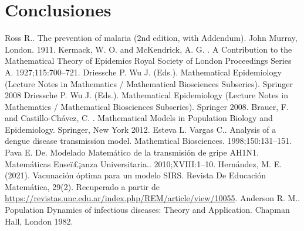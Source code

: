 \documentclass[journal]{IEEEtran}
\begin{document}
\section{Conclusiones}


\ifCLASSOPTIONcaptionsoff
  \newpage
\fi

\begin{thebibliography}{1}

	Ross R.. The prevention of malaria (2nd edition, with Addendum). John Murray, London. 1911.
  Kermack, W. O. and McKendrick, A. G. . A Contribution to the Mathematical Theory of Epidemics
Royal Society of London Proceedings Series A. 1927;115:700–721.
  Driessche P. Wu J. (Eds.). Mathematical Epidemiology (Lecture Notes in Mathematics / Mathematical
Biosciences Subseries). Springer 2008
  Driessche P. Wu J. (Eds.). Mathematical Epidemiology (Lecture Notes in Mathematics / Mathematical
Biosciences Subseries). Springer 2008.
  Brauer, F. and Castillo-Chávez, C. . Mathematical Models in Population Biology and Epidemiology.
Springer, New York 2012.
  Esteva L. Vargas C.. Analysis of a dengue disease transmission model. Mathemtical Biosciences.
1998;150:131–151.
  Pava E. De. Modelado Matemático de la transmisión de gripe AH1N1. Matemáticas Enseï£¡anza
Universitaria.. 2010;XVIII:1–10.
  Hernández, M. E. (2021). Vacunación óptima para un modelo SIRS. Revista De Educación Matemática, 29(2).
Recuperado a partir de \url{https://revistas.unc.edu.ar/index.php/REM/article/view/10055}.
  Anderson R. M.. Population Dynamics of infectious diseases: Theory and Application. Chapman
Hall, London 1982.

\end{thebibliography}
\end{document}
